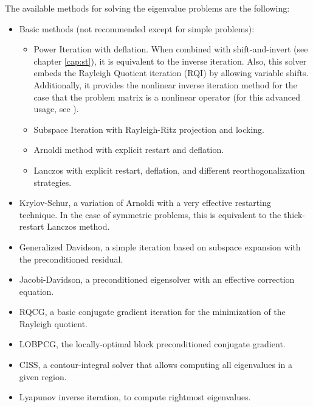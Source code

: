	The available methods for solving the eigenvalue problems are the following:
\begin{itemize}
\setlength{\itemsep}{0pt}
\item Basic methods (not recommended except for simple problems):
\begin{itemize}
\setlength{\itemsep}{-1pt}
\item Power Iteration with deflation. When combined with shift-and-invert (see chapter \ref{cap:st}), it is equivalent to the inverse iteration. Also, this solver embeds the Rayleigh Quotient iteration (RQI) by allowing variable shifts. Additionally, it provides the nonlinear inverse iteration method for the case that the problem matrix is a nonlinear operator (for this advanced usage, see ).
\item Subspace Iteration with Rayleigh-Ritz projection and locking.
\item Arnoldi method with explicit restart and deflation.
\item Lanczos with explicit restart, deflation, and different reorthogonalization strategies.
\end{itemize}
\item Krylov-Schur, a variation of Arnoldi with a very effective restarting technique. In the case of symmetric problems, this is equivalent to the thick-restart Lanczos method.
\item Generalized Davidson, a simple iteration based on subspace expansion with the preconditioned residual.
\item Jacobi-Davidson, a preconditioned eigensolver with an effective correction equation.
\item RQCG, a basic conjugate gradient iteration for the minimization of the Rayleigh quotient.
\item LOBPCG, the locally-optimal block preconditioned conjugate gradient.
\item CISS, a contour-integral solver that allows computing all eigenvalues in a given region.
\item Lyapunov inverse iteration, to compute rightmost eigenvalues.
\end{itemize}

